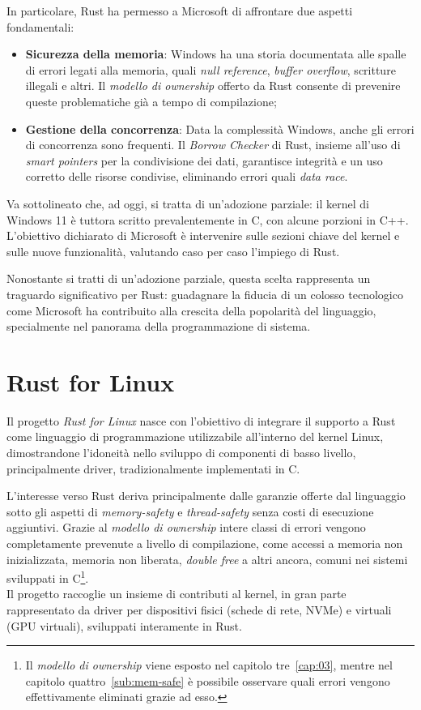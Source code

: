 In particolare, Rust ha permesso a Microsoft di affrontare due aspetti fondamentali:
\begin{itemize}
    \item \textbf{Sicurezza della memoria}: Windows ha una storia documentata alle spalle di errori legati alla memoria, quali \textit{null reference}, \textit{buffer overflow}, scritture illegali e altri. Il \textit{modello di ownership} offerto da Rust consente di prevenire queste problematiche già a tempo di compilazione;
    \item \textbf{Gestione della concorrenza}: Data la complessità Windows, anche gli errori di concorrenza sono frequenti. Il \textit{Borrow Checker} di Rust, insieme all'uso di \textit{smart pointers} per la condivisione dei dati, garantisce integrità e un uso corretto delle risorse condivise, eliminando errori quali \textit{data race}.
\end{itemize}
Va sottolineato che, ad oggi, si tratta di un'adozione parziale: il kernel di Windows 11 è tuttora scritto prevalentemente in C, con alcune porzioni in C++.
L'obiettivo dichiarato di Microsoft è intervenire sulle sezioni chiave del kernel e sulle nuove funzionalità, valutando caso per caso l'impiego di Rust.

Nonostante si tratti di un'adozione parziale, questa scelta rappresenta un traguardo significativo per Rust: guadagnare la fiducia
di un colosso tecnologico come Microsoft ha contribuito alla crescita della popolarità del linguaggio, specialmente nel panorama della programmazione di sistema.

\section{Rust for Linux}
Il progetto \textit{Rust for Linux} nasce con l'obiettivo di integrare il supporto a Rust 
come linguaggio di programmazione utilizzabile all'interno del kernel Linux, dimostrandone l'idoneità nello 
sviluppo di componenti di basso livello, principalmente driver, tradizionalmente 
implementati in C.

L'interesse verso Rust deriva principalmente dalle garanzie offerte dal linguaggio sotto gli aspetti di \textit{memory-safety} e \textit{thread-safety} senza
costi di esecuzione aggiuntivi. Grazie al \textit{modello di ownership} intere classi di errori vengono completamente prevenute a livello di compilazione,
come accessi a memoria non inizializzata, memoria non liberata, \textit{double free} a altri ancora, comuni nei sistemi sviluppati in C\footnote{Il \textit{modello di ownership} viene 
esposto nel capitolo tre~\ref{cap:03}, mentre nel capitolo quattro~\ref{sub:mem-safe} è possibile osservare quali errori vengono effettivamente 
eliminati grazie ad esso.}. \hfill 
\vspace{7pt} \\
\noindent Il progetto raccoglie un insieme di contributi al kernel, in gran parte rappresentato da driver per dispositivi fisici
(schede di rete, NVMe) e virtuali (GPU virtuali), sviluppati interamente in Rust.

